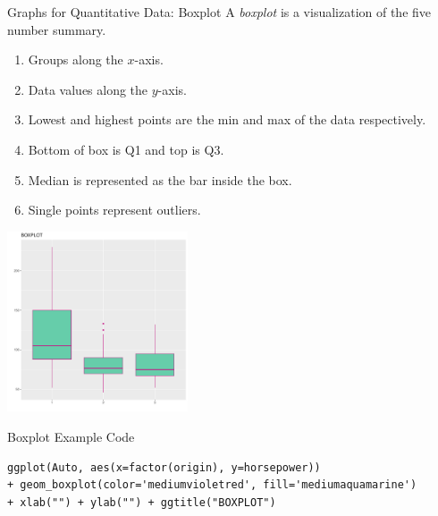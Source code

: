 \documentclass[xcolor=svgnames, 10pt, handout]{beamer}
\begin{document}
\begin{frame}[fragile]{Graphs for Quantitative Data: Boxplot}
A \emph{boxplot} is a visualization of the five number summary.
\begin{multicols}{2}
\begin{enumerate}
\item Groups along the $x$-axis.

\item Data values along the $y$-axis.

\item Lowest and highest points are the min and max of the data respectively.

\item Bottom of box is Q1 and top is Q3.

\item Median is represented as the bar inside the box.

\item Single points represent outliers.
\end{enumerate}
\includegraphics[width=0.4\textwidth]{images/boxplot}
\end{multicols}
\end{frame}


\begin{frame}[fragile]{Boxplot Example Code}
\begin{Verbatim}[xleftmargin=.5em, xrightmargin=.5em, frame=single, label=Boxplot Example, framesep=0.5em, fontsize=\small]
ggplot(Auto, aes(x=factor(origin), y=horsepower))
+ geom_boxplot(color='mediumvioletred', fill='mediumaquamarine')
+ xlab("") + ylab("") + ggtitle("BOXPLOT")
\end{Verbatim}
\end{frame}
\end{document}
